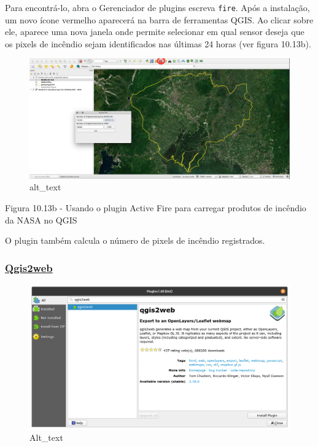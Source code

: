 \documentclass[
]{book}
\begin{document}
Para encontrá-lo, abra o Gerenciador de plugins escreva \texttt{fire}. Após a instalação, um novo ícone vermelho aparecerá na barra de ferramentas QGIS. Ao clicar sobre ele, aparece uma nova janela onde permite selecionar em qual sensor deseja que os pixels de incêndio sejam identificados nas últimas 24 horas (ver figura 10.13b).

\begin{figure}
\centering
\includegraphics{media/modulo10/fig1013_b.png}
\caption{alt\_text}
\end{figure}

Figura 10.13b - Usando o plugin Active Fire para carregar produtos de incêndio da NASA no QGIS

O plugin também calcula o número de pixels de incêndio registrados.

\hypertarget{qgis2web}{%
\subsubsection{\texorpdfstring{\textbf{\href{https://github.com/tomchadwin/qgis2web}{Qgis2web}}}{Qgis2web}}\label{qgis2web}}

\begin{figure}
\centering
\includegraphics{media/modulo10/fig1014_a.png}
\caption{Alt\_text}
\end{figure}
\end{document}
